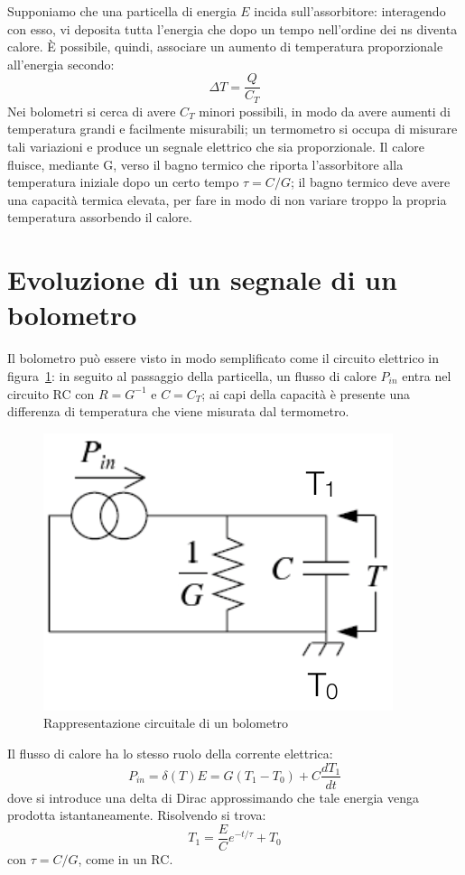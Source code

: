 Supponiamo che una particella di energia $E$ incida sull'assorbitore: interagendo con esso, vi deposita tutta l'energia che dopo un tempo nell'ordine
dei ns diventa calore.
\`E possibile, quindi, associare un aumento di temperatura proporzionale all'energia secondo:
\begin{equation*}
\Delta T = \frac{Q}{C_T}
\end{equation*}
Nei bolometri si cerca di avere $C_T$ minori possibili, in modo da avere aumenti di temperatura grandi e facilmente misurabili;
un termometro si occupa di misurare tali variazioni e produce un segnale elettrico che sia proporzionale.
Il calore fluisce, mediante G, verso il bagno termico che riporta l'assorbitore alla temperatura iniziale dopo un certo tempo $\tau=C/G$; il bagno termico deve avere una capacit\`a
termica elevata, per fare in modo di non variare troppo la propria temperatura assorbendo il calore.
\section{Evoluzione di un segnale di un bolometro}
Il bolometro pu\`o essere visto in modo semplificato come il circuito elettrico in figura~\ref{fig:circuitoBolometro}:
in seguito al passaggio della particella, un flusso di calore $P_{in}$ entra nel circuito RC con $R=G^{-1}$ e $C=C_T$; ai capi della capacit\`a
\`e presente una differenza di temperatura che viene misurata dal termometro.
\begin{figure}[htbp]
\begin{center}
\includegraphics[scale=0.50]{./Immagini/CircuitoBolometro.png}
\caption{Rappresentazione circuitale di un bolometro}
\label{fig:circuitoBolometro}
\end{center}
\end{figure}
Il flusso di calore ha lo stesso ruolo della corrente elettrica: 
\begin{equation*}
P_{in} = \delta(T)E = G(T_1 - T_0) + C \frac{dT_1}{dt}
\end{equation*}
dove si introduce una delta di Dirac approssimando che tale energia venga prodotta istantaneamente.
Risolvendo si trova:
\begin{equation*}
T_1 = \frac{E}{C}e^{-t/\tau} + T_0
\end{equation*}
con $\tau=C/G$, come in un RC.\\
